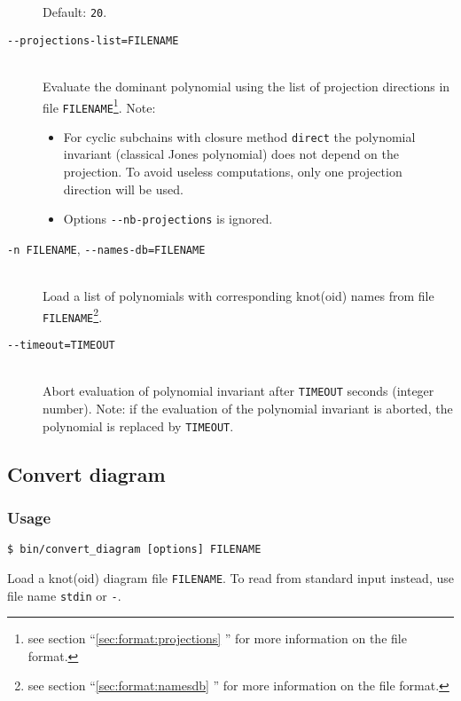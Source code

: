 \begin{description}
  Default: \lstinline{20}.
\item[\lstinline{--projections-list=FILENAME}]\hfill\\
 Evaluate the dominant polynomial using the list of projection directions in file \lstinline{FILENAME}\footnote{see section ``\ref{sec:format:projections} ''  for more information on the file format.}. Note:
  \begin{itemize}
    \item For cyclic subchains with closure method \lstinline{direct} the polynomial invariant (classical Jones polynomial) does not depend on the projection. To avoid useless computations, only one projection direction will be used.
    \item Options  \lstinline{--nb-projections} is ignored.                                  
  \end{itemize}
\item[\lstinline{-n FILENAME}, \lstinline{--names-db=FILENAME}]\hfill\\
  Load a list of polynomials with corresponding knot(oid) names from file \lstinline{FILENAME}\footnote{see section ``\ref{sec:format:namesdb} '' for more information on the file format.}.
\item[\lstinline{--timeout=TIMEOUT}]\hfill\\
  Abort evaluation of polynomial invariant after \lstinline{TIMEOUT} seconds (integer number). Note: if the evaluation of the polynomial invariant is aborted, the polynomial is replaced by \lstinline{TIMEOUT}.
\end{description}

\subsection{Convert diagram}
\subsubsection{Usage}
\begin{lstlisting}
$ bin/convert_diagram [options] FILENAME
\end{lstlisting}


Load a knot(oid) diagram file \lstinline{FILENAME}. To read from standard input instead, use file name \lstinline{stdin} or \lstinline{-}.

